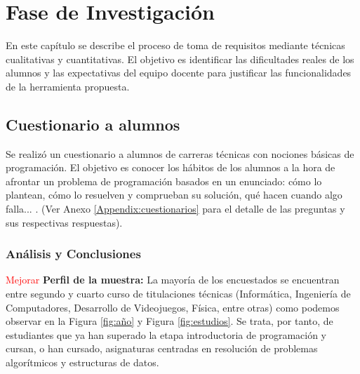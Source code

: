 \chapter{Fase de Investigación}
\label{cap:investigacion}

En este capítulo se describe el proceso de toma de requisitos mediante técnicas cualitativas y cuantitativas. El objetivo es identificar las dificultades reales de los alumnos y las expectativas del equipo docente para justificar las funcionalidades de la herramienta propuesta.

\section{Cuestionario a alumnos}

Se realizó un cuestionario a alumnos de carreras técnicas con nociones básicas de programación. El objetivo es conocer los hábitos de los alumnos a la hora de afrontar un problema de programación basados en un enunciado: cómo lo plantean, cómo lo resuelven y comprueban su solución, qué hacen cuando algo falla... . (Ver Anexo \ref{Appendix:cuestionarios} para el detalle de las preguntas y sus respectivas respuestas).

\subsection{Análisis y Conclusiones}
\textcolor{red}{Mejorar}
\textbf{Perfil de la muestra: }
La mayoría de los encuestados se encuentran entre segundo y cuarto curso de titulaciones técnicas (Informática, Ingeniería de Computadores, Desarrollo de Videojuegos, Física, entre otras) como podemos observar en la Figura \ref{fig:año} y Figura \ref{fig:estudios}. Se trata, por tanto, de estudiantes que ya han superado la etapa introductoria de programación y cursan, o han cursado, asignaturas centradas en resolución de problemas algorítmicos y estructuras de datos.

